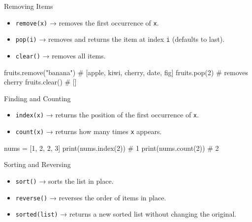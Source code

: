 \documentclass[
  letterpaper,
  DIV=11,
  numbers=noendperiod]{scrreprt}
\newenvironment{Shaded}{\begin{snugshade}}{\end{snugshade}}
\newcommand{\BuiltInTok}[1]{\textcolor[rgb]{0.00,0.23,0.31}{#1}}
\newcommand{\CommentTok}[1]{\textcolor[rgb]{0.37,0.37,0.37}{#1}}
\newcommand{\DecValTok}[1]{\textcolor[rgb]{0.68,0.00,0.00}{#1}}
\newcommand{\NormalTok}[1]{\textcolor[rgb]{0.00,0.23,0.31}{#1}}
\newcommand{\OperatorTok}[1]{\textcolor[rgb]{0.37,0.37,0.37}{#1}}
\newcommand{\StringTok}[1]{\textcolor[rgb]{0.13,0.47,0.30}{#1}}
\providecommand{\tightlist}{%
  \setlength{\itemsep}{0pt}\setlength{\parskip}{0pt}}
\begin{document}
Removing Items

\begin{itemize}
\tightlist
\item
  \texttt{remove(x)} → removes the first occurrence of \texttt{x}.
\item
  \texttt{pop(i)} → removes and returns the item at index \texttt{i}
  (defaults to last).
\item
  \texttt{clear()} → removes all items.
\end{itemize}

\begin{Shaded}
\begin{Highlighting}[]
\NormalTok{fruits.remove(}\StringTok{"banana"}\NormalTok{)   }\CommentTok{\# [\textquotesingle{}apple\textquotesingle{}, \textquotesingle{}kiwi\textquotesingle{}, \textquotesingle{}cherry\textquotesingle{}, \textquotesingle{}date\textquotesingle{}, \textquotesingle{}fig\textquotesingle{}]}
\NormalTok{fruits.pop(}\DecValTok{2}\NormalTok{)             }\CommentTok{\# removes \textquotesingle{}cherry\textquotesingle{}}
\NormalTok{fruits.clear()            }\CommentTok{\# []}
\end{Highlighting}
\end{Shaded}

Finding and Counting

\begin{itemize}
\tightlist
\item
  \texttt{index(x)} → returns the position of the first occurrence of
  \texttt{x}.
\item
  \texttt{count(x)} → returns how many times \texttt{x} appears.
\end{itemize}

\begin{Shaded}
\begin{Highlighting}[]
\NormalTok{nums }\OperatorTok{=}\NormalTok{ [}\DecValTok{1}\NormalTok{, }\DecValTok{2}\NormalTok{, }\DecValTok{2}\NormalTok{, }\DecValTok{3}\NormalTok{]}
\BuiltInTok{print}\NormalTok{(nums.index(}\DecValTok{2}\NormalTok{))  }\CommentTok{\# 1}
\BuiltInTok{print}\NormalTok{(nums.count(}\DecValTok{2}\NormalTok{))  }\CommentTok{\# 2}
\end{Highlighting}
\end{Shaded}

Sorting and Reversing

\begin{itemize}
\tightlist
\item
  \texttt{sort()} → sorts the list in place.
\item
  \texttt{reverse()} → reverses the order of items in place.
\item
  \texttt{sorted(list)} → returns a new sorted list without changing the
  original.
\end{itemize}
\end{document}
